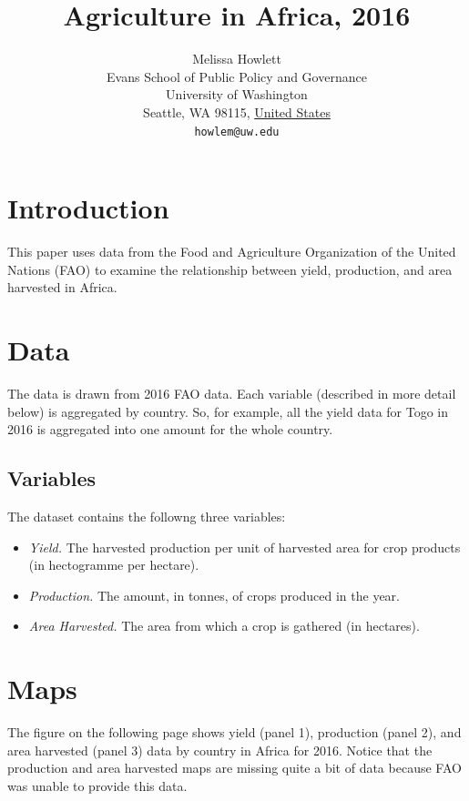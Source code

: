 \documentclass{article}
\title{Agriculture in Africa, 2016}
\author{
        Melissa Howlett\\
        Evans School of Public Policy and Governance\\
        University of Washington\\
        Seattle, WA 98115, \underline{United States}\\
        \texttt{howlem@uw.edu}
}
\begin{document}

\maketitle

\section{Introduction}\label{intro}
This paper uses data from the Food and Agriculture Organization of the United Nations (FAO) to examine the relationship between yield, production, and area harvested in Africa.

\section{Data}\label{datas}
The data is drawn from 2016 FAO data. Each variable (described in more detail below) is aggregated by country. So, for example, all the yield data for Togo in 2016 is aggregated into one amount for the whole country. 

\subsection{Variables}\label{eda}

The dataset contains the followng three variables:
\begin{itemize}
  \item \emph{Yield.} The harvested production per unit of harvested area for crop products (in hectogramme per hectare). 
  \item \emph{Production.} The amount, in tonnes, of crops produced in the year. 
  \item \emph{Area Harvested.} The area from which a crop is gathered (in hectares). 
\end{itemize}


\section{Maps}\label{maps}
The figure on the following page shows yield (panel 1), production (panel 2), and area harvested (panel 3) data by country in Africa for 2016. Notice that the production and area harvested maps are missing quite a bit of data because FAO was unable to provide this data. 
\end{document}
